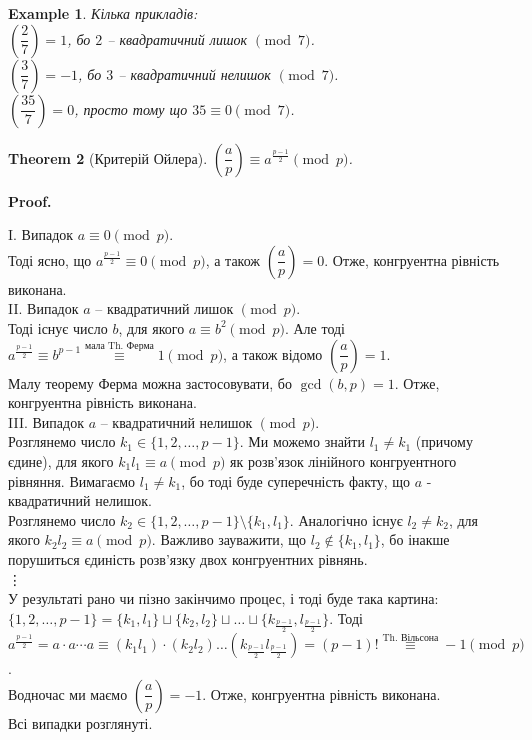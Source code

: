 \documentclass[a4paper, 14pt]{extarticle}
\makeatletter
\theoremstyle{theoremdd}
\newtheorem{theorem}{Theorem}[subsection]
\theoremstyle{theoremdd}
\theoremstyle{theoremdd}
\theoremstyle{theoremdd}
\newtheorem{example}[theorem]{Example}
\theoremstyle{theoremdd}
\theoremstyle{theoremdd}
\theoremstyle{theoremdd}
\theoremstyle{theoremdd}
\def\qed{$\blacksquare$}
\renewenvironment{proof}[1][Proof.\\]{\par
\pushQED{\hfill \qed}%
\normalfont \topsep6\p@\@plus6\p@\relax
\trivlist
\item\relax
{\bfseries
#1\@addpunct{.}}\hspace\labelsep\ignorespaces
}{%
\popQED\endtrivlist\@endpefalse
}
\makeatother
\begin{document}
\begin{example} 
Кілька прикладів:\\
$\left( \dfrac{2}{7} \right) = 1$, бо $2$ -- квадратичний лишок $\pmod 7$.\\
$\left( \dfrac{3}{7} \right) = -1$, бо $3$ -- квадратичний нелишок $\pmod 7$.\\
$\left( \dfrac{35}{7} \right) = 0$, просто тому що $35 \equiv 0 \pmod 7$.
\end{example}

\begin{theorem}[Критерій Ойлера]
$\left( \dfrac{a}{p} \right) \equiv a^{\textstyle\frac{p-1}{2}} \pmod p$.
\end{theorem}

\begin{proof}
I. Випадок $a \equiv 0 \pmod p$.\\
Тоді ясно, що $a^{\frac{p-1}{2}} \equiv 0 \pmod p$, а також $\left( \dfrac{a}{p} \right) = 0$. Отже, конгруентна рівність виконана.
\bigskip \\
II. Випадок $a$ -- квадратичний лишок $\pmod p$.\\
Тоді існує число $b$, для якого $a \equiv b^2 \pmod p$. Але тоді \\ $a^{\frac{p-1}{2}} \equiv b^{p-1} \overset{\text{мала Th. Ферма}}{\equiv} 1 \pmod p$, а також відомо $\left( \dfrac{a}{p} \right) = 1$. \\
Малу теорему Ферма можна застосовувати, бо $\gcd(b,p) = 1$. Отже, конгруентна рівність виконана.
\bigskip \\
III. Випадок $a$ -- квадратичний нелишок $\pmod p$.\\
Розглянемо число $k_1 \in \{1,2,\dots,p-1\}$. Ми можемо знайти $l_1 \neq k_1$ (причому єдине), для якого $k_1 l_1 \equiv a \pmod p$ як розв'язок лінійного конгруентного рівняння. Вимагаємо $l_1 \neq k_1$, бо тоді буде суперечність факту, що $a$ - квадратичний нелишок.\\
Розглянемо число $k_2 \in \{1,2,\dots,p-1\} \setminus \{k_1,l_1\}$. Аналогічно існує $l_2 \neq k_2$, для якого $k_2 l_2 \equiv a \pmod p$. Важливо зауважити, що $l_2 \not\in \{k_1,l_1\}$, бо інакше порушиться єдиність розв'язку двох конгруентних рівнянь.\\
\vdots \\
У результаті рано чи пізно закінчимо процес, і тоді буде така картина:\\
$\{1,2,\dots,p-1\} = \{k_1,l_1\} \sqcup \{k_2,l_2\} \sqcup \dots \sqcup \{k_{\frac{p-1}{2}},l_{\frac{p-1}{2}}\}$. Тоді\\
$a^{\frac{p-1}{2}} = a \cdot a \cdots a \equiv (k_1 l_1) \cdot (k_2 l_2) \dots (k_{\frac{p-1}{2}} l_{\frac{p-1}{2}}) = (p-1)! \overset{\text{Th. Вільсона}}{\equiv} -1 \pmod p$.\\
Водночас ми маємо $\left( \dfrac{a}{p} \right) = -1$. Отже, конгруентна рівність виконана.\\
Всі випадки розглянуті.
\end{proof}
\end{document}
